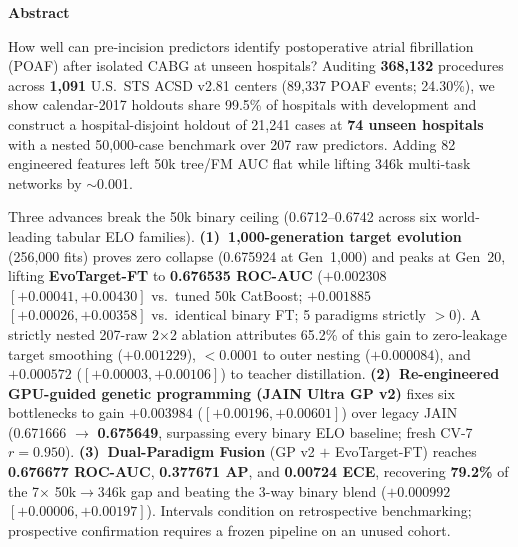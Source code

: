 \begin{center}
\begin{minipage}{0.91\textwidth}
{\centering\sffamily\bfseries\fontsize{9.5}{11.2}\selectfont\color{ink}Abstract\par}\vspace{2.8pt}
\fontsize{8.75}{10.5}\selectfont\noindent
How well can pre-incision predictors identify postoperative atrial fibrillation (POAF) after isolated CABG at unseen hospitals? Auditing \textbf{368,132} procedures across \textbf{1,091} U.S.\ STS ACSD v2.81 centers (89,337 POAF events; 24.30\%), we show calendar-2017 holdouts share 99.5\% of hospitals with development and construct a hospital-disjoint holdout of 21,241 cases at \textbf{74 unseen hospitals} with a nested 50,000-case benchmark over 207 raw predictors. Adding 82 engineered features left 50k tree/FM AUC flat while lifting 346k multi-task networks by $\sim$0.001.

\noindent Three advances break the 50k binary ceiling (0.6712--0.6742 across six world-leading tabular ELO families). \textbf{(1)~1,000-generation target evolution} (256,000 fits) proves zero collapse (0.675924 at Gen~1,000) and peaks at Gen~20, lifting \textbf{EvoTarget-FT} to \textbf{0.676535 ROC-AUC} ($+0.002308$ $[+0.00041, +0.00430]$ vs.\ tuned 50k CatBoost; $+0.001885$ $[+0.00026, +0.00358]$ vs.\ identical binary FT; 5 paradigms strictly $>0$). A strictly nested 207-raw 2$\times$2 ablation attributes 65.2\% of this gain to zero-leakage target smoothing ($+0.001229$), $<0.0001$ to outer nesting ($+0.000084$), and $+0.000572$ ($[+0.00003, +0.00106]$) to teacher distillation. \textbf{(2)~Re-engineered GPU-guided genetic programming (JAIN Ultra GP v2)} fixes six bottlenecks to gain $+0.003984$ ($[+0.00196, +0.00601]$) over legacy JAIN (0.671666 $\to$ \textbf{0.675649}, surpassing every binary ELO baseline; fresh CV-7 $r=0.950$). \textbf{(3)~Dual-Paradigm Fusion} (GP v2 $+$ EvoTarget-FT) reaches \textbf{0.676677 ROC-AUC}, \textbf{0.377671 AP}, and \textbf{0.00724 ECE}, recovering \textbf{79.2\%} of the 7$\times$ 50k$\to$346k gap and beating the 3-way binary blend ($+0.000992$ $[+0.00006, +0.00197]$). Intervals condition on retrospective benchmarking; prospective confirmation requires a frozen pipeline on an unused cohort.
\end{minipage}
\end{center}
